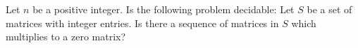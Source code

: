 Let $n$ be a positive integer.
Is the following problem decidable:
Let $S$ be a set of matrices with integer entries.
Is there a sequence of matrices in $S$ which multiplies to a
zero matrix?

